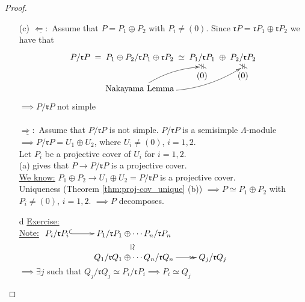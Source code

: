 \begin{prop}
\begin{proof}
\begin{enumerate}
\item[(c)] $\underline{\Leftarrow:}$ Assume that $P = P_1 \oplus P_2$ with $P_i \neq (0)$. Since $\mathfrak{r}P = \mathfrak{r}P_1 \oplus \mathfrak{r}P_2$ we have that
\[\xymatrix@C-1pc@R-2pc{
P / \mathfrak{r}P \ar@{}[r]|-*[@]{=} & P_1 \oplus P_2 / \mathfrak{r}P_1 \oplus \mathfrak{r}P_2 \ar@{}[r]|-*[@]{\simeq} & P_1 / \mathfrak{r}P_1 \ar@{}[r]|-*[@]{\oplus} \ar@{}[dd]|-*[@]{\neq} & P_2 /\mathfrak{r}P_2 \ar@{}[dd]|-*[@]{\neq}\\
                  &                                                         &                 &                 \\
                  &                                                         &      (0)        &      (0)       \\
                  &            \text{Nakayama Lemma} \ar@/^/[uur] \ar@/_1pc/[uurr]                       &                 &                 \\
}
\]
$\implies P/ \mathfrak{r}P$ not simple
\\\\
$\underline{\Rightarrow :}$ Assume that $P / \mathfrak{r}P$ is not simple. $P/\mathfrak{r}P$ is a semisimple $\Lambda$-module $\implies P / \mathfrak{r}P = U_1 \oplus U_2$, where $U_i \neq (0)$, $i=1,2$.\\
Let $P_i$ be a projective cover of $U_i$ for $i=1,2$.\\
(a) gives that $P \to P /\mathfrak{r}P$ is a projective cover.\\ 
\underline{We know:} $P_1 \oplus P_2 \to U_1 \oplus U_2 = P / \mathfrak{r}P$ is a projective cover.\\
Uniqueness (Theorem \ref{thm:proj-cov_unique} (b)) $\implies P \simeq P_1 \oplus P_2$ with $P_i \neq (0)$, $i=1,2$.
$\implies P$ decomposes.


\item[d] \underline{Exercise:}\\
\underline{Note:} $\xymatrix@R-1pc{
P_i / \mathfrak{r}P_i \ar@{^{(}->}[r] & P_1 / \mathfrak{r}P_1  \oplus \cdots P_n / \mathfrak{r}P_n \ar@{}[d]|-*[@]{\simeq} \\
 & Q_1 / \mathfrak{r}Q_1  \oplus \cdots Q_n / \mathfrak{r}Q_n \ar@{->>}[r] & Q_j / \mathfrak{r}Q_j  \\
}$\\
$\implies \exists j$ such that $ Q_j / \mathfrak{r}Q_j \simeq  P_i / \mathfrak{r}P_i \implies P_i \simeq Q_j$
\end{enumerate}
\end{proof}
\end{prop}

